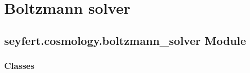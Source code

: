 \documentclass[letterpaper,10pt,english]{sphinxmanual}
\begin{document}
\section{Boltzmann solver}
\label{\detokenize{boltzmann_solver:boltzmann-solver}}\label{\detokenize{boltzmann_solver::doc}}

\subsection{seyfert.cosmology.boltzmann\_solver Module}
\label{\detokenize{boltzmann_solver:module-seyfert.cosmology.boltzmann_solver}}\label{\detokenize{boltzmann_solver:seyfert-cosmology-boltzmann-solver-module}}

\subsubsection{Classes}
\label{\detokenize{boltzmann_solver:classes}}
\end{document}
